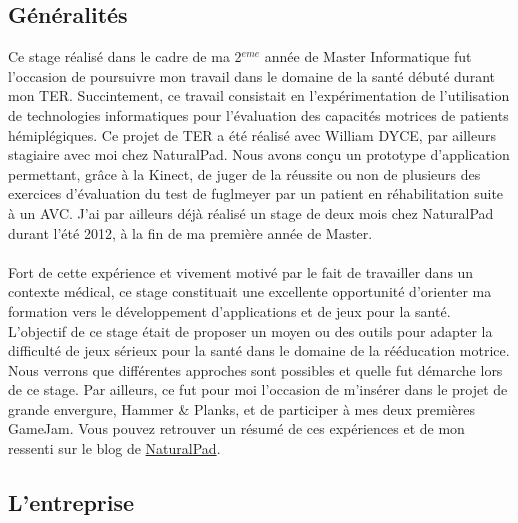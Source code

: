 \subsection{Généralités}
Ce stage réalisé dans le cadre de ma 2$^{eme}$ année de Master Informatique fut l'occasion de poursuivre mon travail dans le domaine de la santé débuté durant mon TER. Succintement, ce travail consistait en l'expérimentation de l'utilisation de technologies informatiques pour l'évaluation des capacités motrices de patients hémiplégiques. Ce projet de TER a été réalisé avec William DYCE, par ailleurs stagiaire avec moi chez NaturalPad. Nous avons conçu un prototype d'application permettant, grâce à la Kinect, de juger de la réussite ou non de plusieurs des exercices d'évaluation du test de \gls{fuglmeyer} par un patient en réhabilitation suite à un AVC. J'ai par ailleurs déjà réalisé un stage de deux mois chez NaturalPad durant l'été 2012, à la fin de ma première année de Master.


\paragraph{}
Fort de cette expérience et vivement motivé par le fait de travailler dans un contexte médical, ce stage constituait une excellente opportunité d'orienter ma formation vers le développement d'applications et de jeux pour la santé.\\
L'objectif de ce stage était de proposer un moyen ou des outils pour adapter la difficulté de jeux sérieux pour la santé dans le domaine de la rééducation motrice. Nous verrons que différentes approches sont possibles et quelle fut démarche lors de ce stage. Par ailleurs, ce fut pour moi l'occasion de m'insérer dans le projet de grande envergure, Hammer \& Planks, et de participer à mes deux premières GameJam. Vous pouvez retrouver un résumé de ces expériences et de mon ressenti sur le blog de \href{http://naturalpad.fr/la-game-jam-chez-naturalpad/}{NaturalPad}.

\subsection{L'entreprise}
